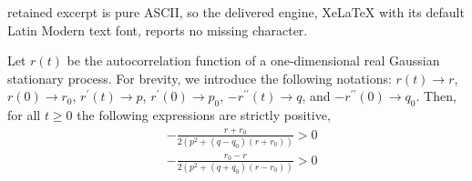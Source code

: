 \documentclass[10pt,a4paper]{amsart}
\newcommand{\rpp}{r^{\prime\prime}}
\newcommand{\rp}{r^\prime}
\begin{document}
retained excerpt is pure ASCII, so the delivered engine, XeLaTeX with its default Latin Modern text font, reports no missing character.
\begin{theorem} \label{thrm:positivity_of_correlation_term}
Let $r(t)$ be the autocorrelation function of a one-dimensional real Gaussian stationary process. For brevity, we introduce the following notations: $r(t)\rightarrow r$, $r(0)\rightarrow r_0$, $\rp(t) \rightarrow p$, $\rp(0)\rightarrow p_0$, $-\rpp(t) \rightarrow q$, and $-\rpp(0)\rightarrow q_0$. Then, for all $t \geq 0$ the following expressions are strictly positive,
\begin{equation}
\begin{split}
 &-\frac{r+r_0}{2\left(p^2+(q-q_0)(r+r_0)\right)} > 0 \\
 &-\frac{r_0-r}{2\left(p^2+(q+q_0)(r-r_0)\right)} > 0
\end{split}
\end{equation}
\end{theorem}
\end{document}
